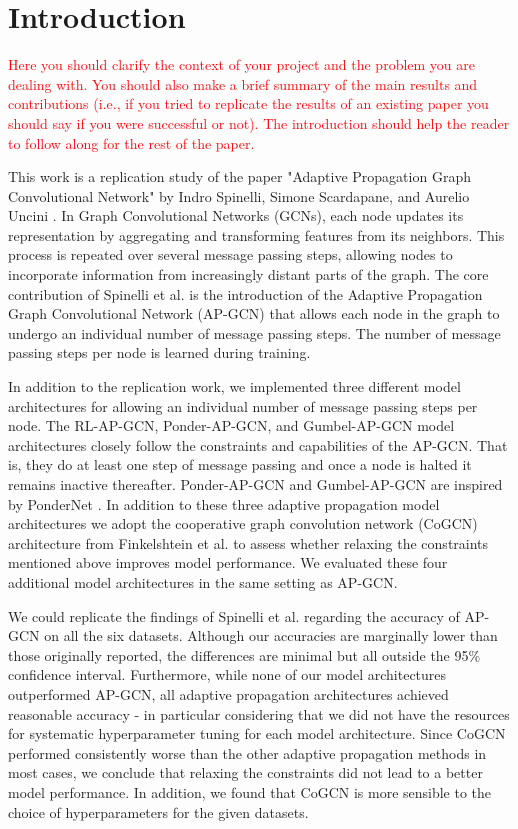 \documentclass{gdl}
\begin{document}
\maketitle

\section{Introduction}

\textcolor{red}{Here you should clarify the context of your project and the problem you are dealing with. You should also make a brief summary of the main results and contributions (i.e., if you tried to replicate the results of an existing paper you should say if you were successful or not). The introduction should help the reader to follow along for the rest of the paper.}

This work is a replication study of the paper "Adaptive Propagation Graph Convolutional Network" by Indro Spinelli, Simone Scardapane, and Aurelio Uncini \cite{spinelli2021}. In Graph Convolutional Networks (GCNs), each node updates its representation by aggregating and transforming features from its neighbors. This process is repeated over several message passing steps, allowing nodes to incorporate information from increasingly distant parts of the graph. The core contribution of Spinelli et al. is the introduction of the Adaptive Propagation Graph Convolutional Network (AP-GCN) that allows each node in the graph to undergo an individual number of message passing steps. The number of message passing steps per node is learned during training.

In addition to the replication work, we implemented three different model architectures for allowing an individual number of message passing steps per node. The RL-AP-GCN, Ponder-AP-GCN, and Gumbel-AP-GCN model architectures closely follow the constraints and capabilities of the AP-GCN. That is, they do at least one step of message passing and once a node is halted it remains inactive thereafter. Ponder-AP-GCN and Gumbel-AP-GCN are inspired by PonderNet \cite{banino2021}. In addition to these three adaptive propagation model architectures we adopt the cooperative graph convolution network (CoGCN) architecture from Finkelshtein et al. \cite{finkelshtein2024} to assess whether relaxing the constraints mentioned above improves model performance. We evaluated these four additional model architectures in the same setting as AP-GCN.

We could replicate the findings of Spinelli et al. regarding the accuracy of AP-GCN on all the six datasets. Although our accuracies are marginally lower than those originally reported, the differences are minimal but all outside the 95\% confidence interval. 
Furthermore, while none of our model architectures outperformed AP-GCN, all adaptive propagation architectures achieved reasonable accuracy - in particular considering that we did not have the resources for systematic hyperparameter tuning for each model architecture. Since CoGCN performed consistently worse than the other adaptive propagation methods in most cases, we conclude that relaxing the constraints did not lead to a better model performance. In addition, we found that CoGCN is more sensible to the choice of hyperparameters for the given datasets.
\end{document}
